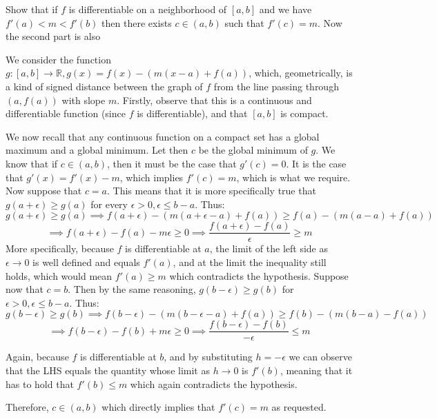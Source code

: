 \begin{exercise}{7}
    Show that if $f$ is differentiable on a neighborhood of $[a, b]$ and we have $f'(a) < m < f'(b)$ then there exists $c \in (a, b)$ such that $f'(c) = m$. Now the second part is also
\end{exercise}

\begin{solution}

    We consider the function $g: [a, b] \rightarrow \mathbb{R}, g(x) = f(x) - (m(x-a) + f(a))$, which, geometrically, is a kind of signed distance between the graph of $f$ from the line passing through $(a, f(a))$ with slope $m$. Firstly, observe that this is a continuous and differentiable function (since $f$ is differentiable), and that $[a, b]$ is compact.

    We now recall that any continuous function on a compact set has a global maximum and a global minimum. Let then $c$ be the global minimum of $g$. We know that if $c \in (a, b)$, then it must be the case that $g'(c) = 0$. It is the case that $g'(x) = f'(x) - m$, which implies $f'(c) = m$, which is what we require. Now suppose that $c = a$. This means that it is more specifically true that $g(a + \epsilon) \geq g(a)$ for every $\epsilon > 0, \epsilon \leq b - a$. Thus:
    $$g(a + \epsilon) \geq g(a) \implies f(a + \epsilon) - (m(a + \epsilon - a) + f(a)) \geq f(a) - (m(a - a) + f(a))$$
    $$\implies f(a+ \epsilon) - f(a) - m\epsilon \geq 0 \implies \frac{f(a+ \epsilon) - f(a)}{\epsilon} \geq m$$
    More specifically, because $f$ is differentiable at $a$, the limit of the left side as $\epsilon \rightarrow 0$ is well defined and equals $f'(a)$, and at the limit the inequality still holds, which would mean $f'(a) \geq m$ which contradicts the hypothesis. Suppose now that $c = b$. Then by the same reasoning, $g(b - \epsilon) \geq g(b)$ for $\epsilon > 0, \epsilon \leq b - a$. Thus:
    $$g(b - \epsilon) \geq g(b) \implies f(b - \epsilon) - (m(b - \epsilon - a) + f(a)) \geq f(b) - (m(b-a) - f(a))$$
    $$\implies f(b - \epsilon) - f(b) + m\epsilon \geq 0 \implies \frac{f(b - \epsilon) - f(b)}{-\epsilon} \leq m$$

    Again, because $f$ is differentiable at $b$, and by substituting $h = - \epsilon$ we can observe that the LHS equals the quantity whose limit as $h \rightarrow 0$ is $f'(b)$, meaning that it has to hold that $f'(b) \leq m$ which again contradicts the hypothesis.

    Therefore, $c \in (a, b)$ which directly implies that $f'(c) = m$ as requested.
\end{solution}

